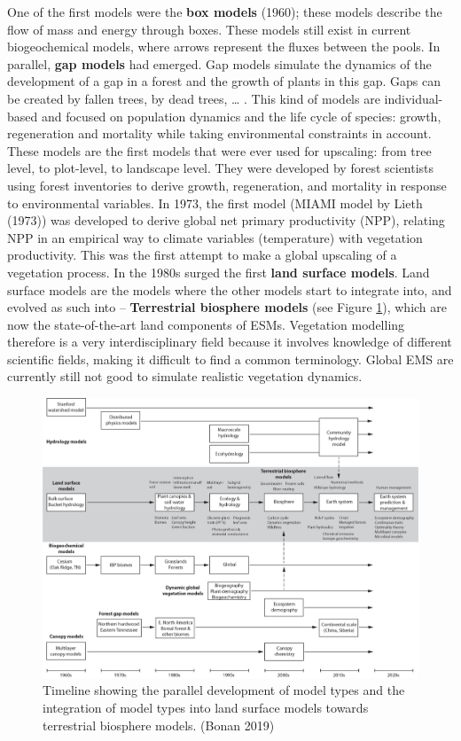 \documentclass[
  12pt,
  oneside]{book}
\begin{document}
One of the first models were the \textbf{box models} (1960); these models describe the flow of mass and energy through boxes. These models still exist in current biogeochemical models, where arrows represent the fluxes between the pools. In parallel, \textbf{gap models} had emerged. Gap models simulate the dynamics of the development of a gap in a forest and the growth of plants in this gap. Gaps can be created by fallen trees, by dead trees, \ldots{} . This kind of models are individual-based and focused on population dynamics and the life cycle of species: growth, regeneration and mortality while taking environmental constraints in account. These models are the first models that were ever used for upscaling: from tree level, to plot-level, to landscape level. They were developed by forest scientists using forest inventories to derive growth, regeneration, and mortality in response to environmental variables.
In 1973, the first model (MIAMI model by Lieth (1973)) was developed to derive global net primary productivity (NPP), relating NPP in an empirical way to climate variables (temperature) with vegetation productivity. This was the first attempt to make a global upscaling of a vegetation process.
In the 1980s surged the first \textbf{land surface models}. Land surface models are the models where the other models start to integrate into, and evolved as such into -- \textbf{Terrestrial biosphere models} (see Figure \ref{fig:f7}), which are now the state-of-the-art land components of ESMs.
Vegetation modelling therefore is a very interdisciplinary field because it involves knowledge of different scientific fields, making it difficult to find a common terminology. Global EMS are currently still not good to simulate realistic vegetation dynamics.

\begin{figure}

{\centering \includegraphics[width=0.8\linewidth]{figures/chap1/timeline} 

}

\caption{Timeline showing the parallel development of model types and the integration of model types into land surface models towards terrestrial biosphere models. (Bonan 2019)}\label{fig:f7}
\end{figure}
\end{document}
